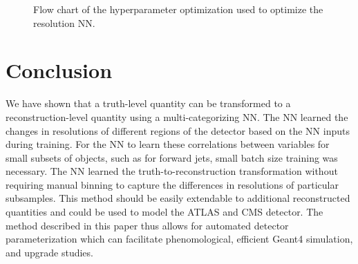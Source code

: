 \documentclass[showpacs,showkeys,preprint,prd,nofootinbib,linenumbers,12pt,superscriptaddress]{revtex4-1}
\begin{document}
\begin{figure}[htb]
  \caption{Flow chart of the hyperparameter optimization used to optimize the resolution NN.}
  \label{fig:hyperFlow}
\end{figure}

\section{Conclusion}

We have shown that a truth-level quantity can be transformed to a reconstruction-level quantity using a multi-categorizing NN. The NN learned the changes in resolutions of different regions of the detector based on the NN inputs during training. For the NN to learn these correlations between variables for small subsets of objects, such as for forward jets, small batch size training was necessary. The NN learned the truth-to-reconstruction transformation without requiring manual binning to capture the differences in resolutions of particular subsamples. This method should be easily extendable to additional reconstructed quantities and could be used to model the ATLAS and CMS detector. The method described in this paper thus allows for automated detector parameterization which can facilitate phenomological, efficient Geant4 simulation, and upgrade studies. 
\end{document}
